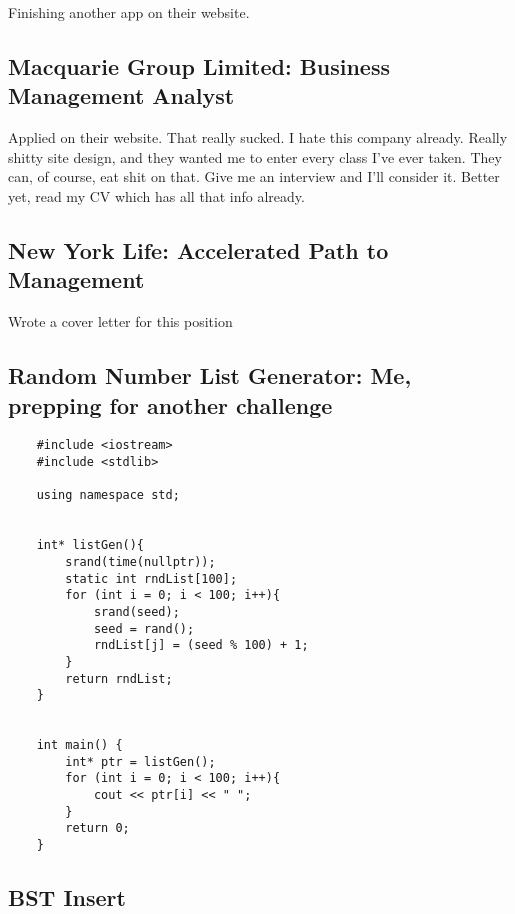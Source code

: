 \documentclass[
	letterpaper, %
	12pt, %
]{CSSullivanBusinessReport}
\begin{document}
Finishing another app on their website. 


\subsection[Macquarie Group Limited]{Macquarie Group Limited: Business Management Analyst}

Applied on their website. That really sucked. I hate this company already. Really shitty site design, and they wanted me to enter every class I've ever taken. They can, of course, eat shit on that. Give me an interview and I'll consider it. Better yet, read my CV which has all that info already. 


\subsection[New York Life]{New York Life: Accelerated Path to Management}

Wrote a cover letter for this position



\subsection[Random Number List Generator]{Random Number List Generator: Me, prepping for another challenge}

\begin{verbatim}
	#include <iostream>
	#include <stdlib>

	using namespace std;


	int* listGen(){
		srand(time(nullptr));
		static int rndList[100];
		for (int i = 0; i < 100; i++){
			srand(seed);
			seed = rand();
			rndList[j] = (seed % 100) + 1;
		}
		return rndList;
	}


	int main() {
		int* ptr = listGen();
		for (int i = 0; i < 100; i++){
			cout << ptr[i] << " ";
		}
		return 0;
	}
\end{verbatim}


\subsection[BST Insert]{BST Insert}
\end{document}
